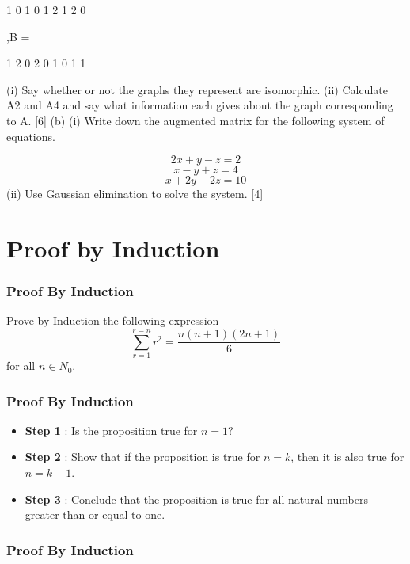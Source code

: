 \documentclass[]{report}
\begin{document}
1 0 1
0 1 2
1 2 0

 ,B =

1 2 0
2 0 1
0 1 1



(i) Say whether or not the graphs they represent are isomorphic.
(ii) Calculate A2 and A4 and say what information each gives about the graph
corresponding to A. [6]
(b) (i) Write down the augmented matrix for the following system of equations.

\[2x + y - z = 2\]
\[x - y + z = 4\]
\[x + 2y + 2z = 10\]
(ii) Use Gaussian elimination to solve the system. [4]


\newpage
\chapter{Proof by Induction}

\subsection{Proof By Induction}

Prove by Induction the following expression
\[ \sum_{r=1}^{r=n} r^2 = \frac{n(n+1)(2n+1)}{6} \]
for all $n \in N_0$.


\subsection{Proof By Induction}

\begin{itemize}
\item \textbf{Step 1} : Is the proposition true for $n = 1$?
\item \textbf{Step 2} : Show that if the proposition is true for $n=k$, then it is also true for $n=k+1$.
\item \textbf{Step 3} : Conclude that the proposition is true for all natural numbers greater than or equal to one.
\end{itemize}


\subsection{Proof By Induction}
\end{document}
